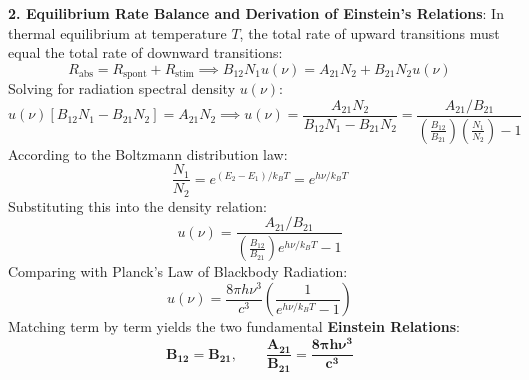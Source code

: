 \begin{theorysol}
\textbf{2. Equilibrium Rate Balance and Derivation of Einstein's Relations}:
In thermal equilibrium at temperature $T$, the total rate of upward transitions must equal the total rate of downward transitions:
\begin{equation}
R_{\text{abs}} = R_{\text{spont}} + R_{\text{stim}} \implies B_{12} N_1 u(\nu) = A_{21} N_2 + B_{21} N_2 u(\nu)
\end{equation}
Solving for radiation spectral density $u(\nu)$:
\begin{equation}
u(\nu)\left[ B_{12} N_1 - B_{21} N_2 \right] = A_{21} N_2 \implies u(\nu) = \frac{A_{21} N_2}{B_{12} N_1 - B_{21} N_2} = \frac{A_{21}/B_{21}}{\left(\frac{B_{12}}{B_{21}}\right)\left(\frac{N_1}{N_2}\right) - 1}
\end{equation}
According to the Boltzmann distribution law:
\begin{equation}
\frac{N_1}{N_2} = e^{(E_2 - E_1)/k_BT} = e^{h\nu / k_BT}
\end{equation}
Substituting this into the density relation:
\begin{equation}
u(\nu) = \frac{A_{21}/B_{21}}{\left(\frac{B_{12}}{B_{21}}\right)e^{h\nu/k_BT} - 1}
\end{equation}
Comparing with Planck's Law of Blackbody Radiation:
\begin{equation}
u(\nu) = \frac{8\pi h \nu^3}{c^3}\left(\frac{1}{e^{h\nu/k_BT} - 1}\right)
\end{equation}
Matching term by term yields the two fundamental \textbf{Einstein Relations}:
\begin{equation}
\mathbf{B_{12} = B_{21}}, \qquad \mathbf{\frac{A_{21}}{B_{21}} = \frac{8\pi h \nu^3}{c^3}}
\end{equation}
\end{theorysol}
\vspace{4mm}

